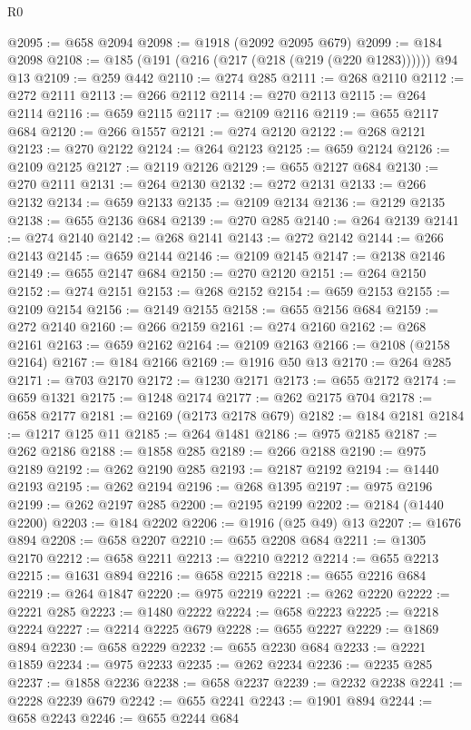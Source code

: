 \begin{lexlean}{R0}
\begin{coremodule}
@2095 := @658 @2094
@2098 := @1918 (@2092 @2095 @679)
@2099 := @184 @2098
@2108 := @185 (@191 (@216 (@217 (@218 (@219 (@220 @1283)))))) @94 @13
@2109 := @259 @442
@2110 := @274 @285
@2111 := @268 @2110
@2112 := @272 @2111
@2113 := @266 @2112
@2114 := @270 @2113
@2115 := @264 @2114
@2116 := @659 @2115
@2117 := @2109 @2116
@2119 := @655 @2117 @684
@2120 := @266 @1557
@2121 := @274 @2120
@2122 := @268 @2121
@2123 := @270 @2122
@2124 := @264 @2123
@2125 := @659 @2124
@2126 := @2109 @2125
@2127 := @2119 @2126
@2129 := @655 @2127 @684
@2130 := @270 @2111
@2131 := @264 @2130
@2132 := @272 @2131
@2133 := @266 @2132
@2134 := @659 @2133
@2135 := @2109 @2134
@2136 := @2129 @2135
@2138 := @655 @2136 @684
@2139 := @270 @285
@2140 := @264 @2139
@2141 := @274 @2140
@2142 := @268 @2141
@2143 := @272 @2142
@2144 := @266 @2143
@2145 := @659 @2144
@2146 := @2109 @2145
@2147 := @2138 @2146
@2149 := @655 @2147 @684
@2150 := @270 @2120
@2151 := @264 @2150
@2152 := @274 @2151
@2153 := @268 @2152
@2154 := @659 @2153
@2155 := @2109 @2154
@2156 := @2149 @2155
@2158 := @655 @2156 @684
@2159 := @272 @2140
@2160 := @266 @2159
@2161 := @274 @2160
@2162 := @268 @2161
@2163 := @659 @2162
@2164 := @2109 @2163
@2166 := @2108 (@2158 @2164)
@2167 := @184 @2166
@2169 := @1916 @50 @13
@2170 := @264 @285
@2171 := @703 @2170
@2172 := @1230 @2171
@2173 := @655 @2172
@2174 := @659 @1321
@2175 := @1248 @2174
@2177 := @262 @2175 @704
@2178 := @658 @2177
@2181 := @2169 (@2173 @2178 @679)
@2182 := @184 @2181
@2184 := @1217 @125 @11
@2185 := @264 @1481
@2186 := @975 @2185
@2187 := @262 @2186
@2188 := @1858 @285
@2189 := @266 @2188
@2190 := @975 @2189
@2192 := @262 @2190 @285
@2193 := @2187 @2192
@2194 := @1440 @2193
@2195 := @262 @2194
@2196 := @268 @1395
@2197 := @975 @2196
@2199 := @262 @2197 @285
@2200 := @2195 @2199
@2202 := @2184 (@1440 @2200)
@2203 := @184 @2202
@2206 := @1916 (@25 @49) @13
@2207 := @1676 @894
@2208 := @658 @2207
@2210 := @655 @2208 @684
@2211 := @1305 @2170
@2212 := @658 @2211
@2213 := @2210 @2212
@2214 := @655 @2213
@2215 := @1631 @894
@2216 := @658 @2215
@2218 := @655 @2216 @684
@2219 := @264 @1847
@2220 := @975 @2219
@2221 := @262 @2220
@2222 := @2221 @285
@2223 := @1480 @2222
@2224 := @658 @2223
@2225 := @2218 @2224
@2227 := @2214 @2225 @679
@2228 := @655 @2227
@2229 := @1869 @894
@2230 := @658 @2229
@2232 := @655 @2230 @684
@2233 := @2221 @1859
@2234 := @975 @2233
@2235 := @262 @2234
@2236 := @2235 @285
@2237 := @1858 @2236
@2238 := @658 @2237
@2239 := @2232 @2238
@2241 := @2228 @2239 @679
@2242 := @655 @2241
@2243 := @1901 @894
@2244 := @658 @2243
@2246 := @655 @2244 @684

\end{coremodule}
\end{lexlean}
